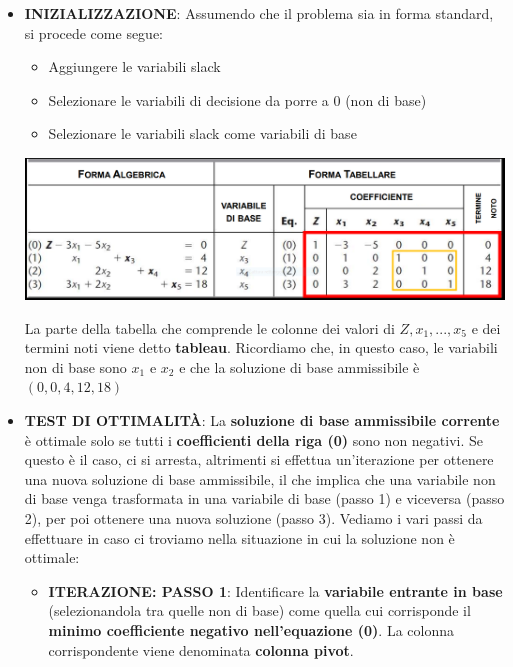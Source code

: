 \documentclass[12pt]{article}
\begin{document}
\begin{itemize}
    \item \textbf{INIZIALIZZAZIONE}: Assumendo che il problema sia in forma standard, si procede come segue:
    \begin{itemize}
        \item Aggiungere le variabili slack
        \item Selezionare le variabili di decisione da porre a 0 (non di base)
        \item Selezionare le variabili slack come variabili di base
    \end{itemize}
    \begin{center}
        \vspace{-0.3cm}
        \includegraphics[width = 1\linewidth]{Images/29.PNG}
        \vspace{-1cm}
    \end{center}
    La parte della tabella che comprende le colonne dei valori di $Z, x_1, ..., x_5$ e dei termini noti viene detto \textbf{tableau}.
    Ricordiamo che, in questo caso, le variabili non di base sono $x_1$ e $x_2$ e che la soluzione di base ammissibile è $(0, 0, 4, 12, 18)$
    \item \textbf{TEST DI OTTIMALITÀ}: La \textbf{soluzione di base ammissibile corrente} è ottimale solo se tutti i \textbf{coefficienti della riga (0)} sono non negativi.
    Se questo è il caso, ci si arresta, altrimenti si effettua un'iterazione per ottenere una nuova soluzione di base ammissibile, il che implica che una variabile non di base venga trasformata in una variabile di base (passo 1)
    e viceversa (passo 2), per poi ottenere una nuova soluzione (passo 3).
    Vediamo i vari passi da effettuare in caso ci troviamo nella situazione in cui la soluzione non è ottimale:
    \begin{itemize}
        \item \textbf{ITERAZIONE: PASSO 1}: Identificare la \textbf{variabile entrante in base} (selezionandola tra quelle non di base) come quella cui corrisponde il \textbf{minimo coefficiente negativo nell'equazione (0)}.
        La colonna corrispondente viene denominata \textbf{colonna pivot}.

\end{itemize}
\end{itemize}
\end{document}
